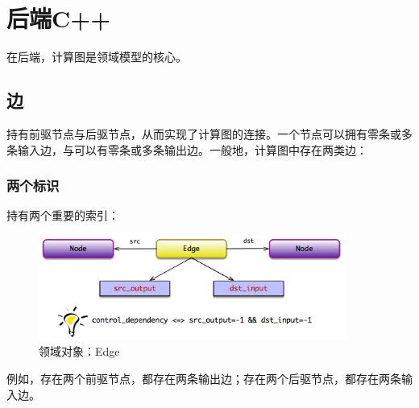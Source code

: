 \section{后端C++}

\begin{content}

在后端，计算图是领域模型的核心。

\subsection{边}

持有前驱节点与后驱节点，从而实现了计算图的连接。一个节点可以拥有零条或多条输入边，与可以有零条或多条输出边。一般地，计算图中存在两类边：

\begin{enum}
\end{enum}

\subsubsection{两个标识}

持有两个重要的索引：

\begin{enum}
\end{enum}


\begin{figure}[!htbp]
\centering
\includegraphics[width=0.9\textwidth]{figures/cc-edge-model.png}
\caption{领域对象：Edge}
 \label{fig:cc-edge-model}
\end{figure}

例如，存在两个前驱节点，都存在两条输出边；存在两个后驱节点，都存在两条输入边。


\end{content}
